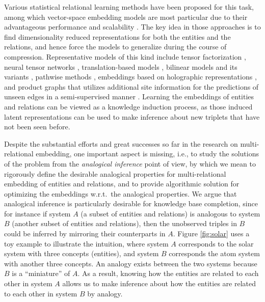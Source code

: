 \documentclass{article}
\begin{document}
Various statistical relational learning methods \cite{getoor2007introduction, nickel2015review}
have been proposed for this task,
among which vector-space embedding models are most particular due to their advantageous performance and scalability \cite{bordes2013translating}. The key idea in those approaches
is to find dimensionality reduced representations for both the entities and the relations, and hence 
force the models to generalize during the course of compression.
Representative models of this kind include tensor factorization
\cite{singhal2012introducing, nickel2011three},
neural tensor networks \cite{socher2013reasoning, chen2013learning},
translation-based models \cite{bordes2013translating, wang2014knowledge, lin2015learning},
bilinear models and its variants \cite{DBLP:journals/corr/YangYHGD14a, DBLP:conf/icml/TrouillonWRGB16},
pathwise methods \cite{guu2015traversing}, embeddings based on holographic representations \cite{DBLP:conf/aaai/NickelRP16}, and product graphs that utilizes additional site information for the predictions of unseen edges in a semi-supervised manner \cite{liu2015bipartite,liu2016cross}.
Learning the embeddings of entities and relations can be viewed as a knowledge induction process, as those induced latent representations can be used to make inference about new triplets that have not been seen before.

Despite the substantial efforts and great successes so far in the research on multi-relational embedding, one important aspect is missing, i.e., to study the solutions of the problem from the \textit{analogical inference} point of view, by which we mean to rigorously define the desirable analogical properties for multi-relational embedding of entities and relations, and to provide algorithmic solution for optimizing the embeddings w.r.t.\ the analogical properties.
We argue that analogical inference is particularly 
desirable for knowledge base completion,
since for instance if system $A$ (a subset of entities and relations) is analogous to system $B$ (another subset of entities and relations),
then the unobserved triples in $B$ could be inferred by mirroring their counterparts in $A$. Figure \ref{fig:solar} uses a toy example to illustrate the intuition, where system $A$ corresponds to the solar system with three concepts (entities), and system $B$ corresponds the atom system with another three concepts. An analogy exists between the two systems because $B$ is a ``miniature'' of $A$. As a result, knowing how the entities are related to each other in system $A$ allows us to make inference about how the entities are related to each other in system $B$ by analogy.
\end{document}

